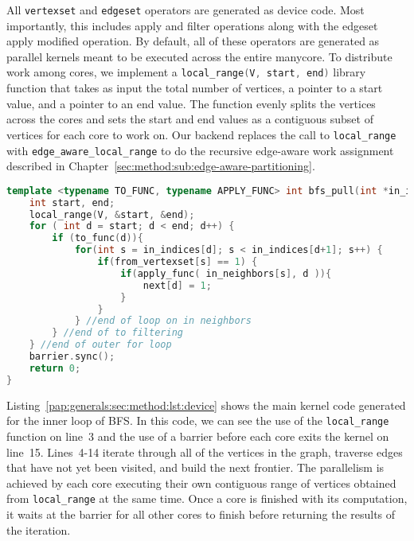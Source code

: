 All \lstinline[language=graphit]{vertexset} and  \lstinline[language=graphit]{edgeset} operators are generated as device code. Most importantly, this includes apply and filter operations along with the edgeset apply modified operation. 
By default, all of these operators are generated as parallel kernels meant to be executed across the entire manycore. 
To distribute work among cores, we implement a \lstinline[language=C++, basicstyle=\small\ttfamily]{local_range(V, start, end)} library function that takes as input the total number of vertices, a pointer to a start value, and a pointer to an end value.
The function evenly splits the vertices across the cores and sets the start and end values as a contiguous subset of vertices for each core to work on. 
Our backend replaces the call to \lstinline[language=C++, basicstyle=\small\ttfamily]{local_range} with \lstinline[language=C++, basicstyle=\small\ttfamily]{edge_aware_local_range} to do the recursive edge-aware work assignment described in Chapter~\ref{sec:method:sub:edge-aware-partitioning}.
\newline
\begin{lstlisting}[language=C++, breaklines=true, 
                   caption=Generated \hb device code for the Breadth-First Search (BFS) program shown in Listing~\ref{pap:generals2020:sec:background:lst:graphit}.,
                   label=pap:generals:sec:method:lst:device]
template <typename TO_FUNC, typename APPLY_FUNC> int bfs_pull(int *in_indices , int *in_neighbors, int *from_vertexset, TO_FUNC to_func, APPLY_FUNC apply_func) { 
    int start, end;
    local_range(V, &start, &end);
    for ( int d = start; d < end; d++) {
        if (to_func(d)){ 
            for(int s = in_indices[d]; s < in_indices[d+1]; s++) {
                if(from_vertexset[s] == 1) {
                    if(apply_func( in_neighbors[s], d )){ 
                        next[d] = 1; 
                    }
                }
            } //end of loop on in neighbors
        } //end of to filtering
    } //end of outer for loop
    barrier.sync();
    return 0;
}
\end{lstlisting}

Listing~\ref{pap:generals:sec:method:lst:device} shows the main kernel code generated for the inner loop of BFS. 
In this code, we can see the use of the \lstinline[language=C++, basicstyle=\small\ttfamily]{local_range} function on line~3 and the use of a barrier before each core exits the kernel on line~15. 
Lines~4-14 iterate through all of the vertices in the graph, traverse edges that have not yet been visited, and build the next frontier.
The parallelism is achieved by each core executing their own contiguous range of vertices obtained from \lstinline[language=C++, basicstyle=\small\ttfamily]{local_range} at the same time. Once a core is finished with its computation, it waits at the barrier for all other cores to finish before returning the results of the iteration. 

